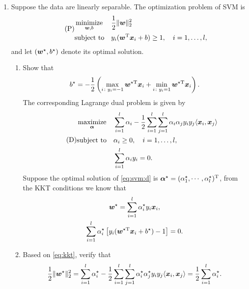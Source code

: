 \documentclass[a4paper]{article}
\begin{document}
\begin{enumerate}
  \setlength{\itemsep}{3\parskip}
\item Suppose the data are linearly separable. The optimization problem of SVM is  \begin{equation}
    \tag{P}
    \begin{aligned}
      &\operatorname*{minimize}_{\bm{w}, b}& &\frac12 \|\bm{w}\|_2^2\\
      &\mathrm{subject~to}& &y_i(\bm{w}^{\mathrm{T}}\bm{x}_i + b) \geq 1, \quad i = 1, \dots, l,
    \end{aligned}
    \label{eq:svm:p}
  \end{equation}
  and let $(\bm{w}^{\star}, b^{\star})$ denote its optimal solution.
  \begin{enumerate}
  \item Show that
    \begin{equation*}
      b^{\star} = -\frac12 \left(\max_{i\colon y_i = -1}\bm{w}^{\star\mathrm{T}}\bm{x}_i + \min_{i\colon y_i = 1}\bm{w}^{\star\mathrm{T}}\bm{x}_i\right).
    \end{equation*}
    \noindent The corresponding Lagrange dual problem is given by
  \begin{equation}
    \tag{D}
    \begin{aligned}
      &\operatorname*{maximize}_{\bm{\alpha}}& &\sum_{i = 1}^l \alpha_i - \frac12\sum_{i = 1}^l\sum_{j = 1}^l \alpha_i\alpha_jy_iy_j \langle \bm{x}_i, \bm{x}_j\rangle\\
      &\mathrm{subject~to}& &\alpha_i \geq 0, \quad i = 1, \dots, l,\\
      && &\sum_{i = 1}^l \alpha_iy_i = 0.
    \end{aligned}
    \label{eq:svm:d}
  \end{equation}
   Suppose the optimal solution of \eqref{eq:svm:d} is $\bm{\alpha}^{\star} = (\alpha_1^{\star}, \cdots, \alpha_l^{\star})^{\mathrm{T}}$, from the KKT conditions we know that
  \begin{equation}
    \begin{gathered}
      \bm{w}^{\star} = \sum_{i = 1}^{l} \alpha_i^{\star} y_i \bm{x}_i,\\
      \sum_{i = 1}^l \alpha_i^{\star}\left[y_i(\bm{w}^{\star\mathrm{T}}\bm{x}_i + b^{\star}) - 1\right] = 0.
    \end{gathered}
    \label{eq:kkt}
  \end{equation}
  \item
  Based on \eqref{eq:kkt}, verify that
  \begin{equation*}
    \frac12 \|\bm{w}^{\star}\|_2^2 = \sum_{i = 1}^l \alpha^{\star}_i - \frac12\sum_{i = 1}^l\sum_{j = 1}^l \alpha^{\star}_i\alpha^{\star}_jy_iy_j \langle \bm{x}_i, \bm{x}_j\rangle = \frac12\sum_{i = 1}^l \alpha^{\star}_i.
  \end{equation*}
  \end{enumerate}  


\end{enumerate}
\end{document}
